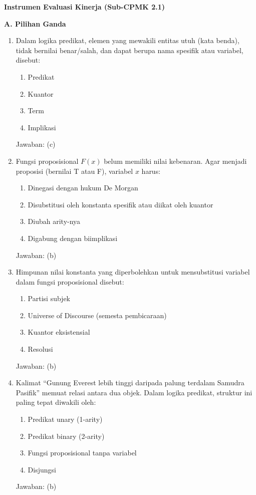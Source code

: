 \documentclass[../main]{subfiles}
\begin{document}
\begin{asesmen}
\textbf{Instrumen Evaluasi Kinerja (Sub-CPMK 2.1)}

\textbf{A. Pilihan Ganda}
\begin{enumerate}
  \item Dalam logika predikat, elemen yang mewakili entitas utuh (kata benda), tidak bernilai benar/salah, dan dapat berupa nama spesifik atau variabel, disebut:
  \begin{enumerate}
    \item Predikat
    \item Kuantor
    \item Term
    \item Implikasi
  \end{enumerate}
  Jawaban: (c)

  \item Fungsi proposisional $F(x)$ belum memiliki nilai kebenaran. Agar menjadi proposisi (bernilai T atau F), variabel $x$ harus:
  \begin{enumerate}
    \item Dinegasi dengan hukum De Morgan
    \item Disubstitusi oleh konstanta spesifik atau diikat oleh kuantor
    \item Diubah arity-nya
    \item Digabung dengan biimplikasi
  \end{enumerate}
  Jawaban: (b)

  \item Himpunan nilai konstanta yang diperbolehkan untuk mensubstitusi variabel dalam fungsi proposisional disebut:
  \begin{enumerate}
    \item Partisi subjek
    \item Universe of Discourse (semesta pembicaraan)
    \item Kuantor eksistensial
    \item Resolusi
  \end{enumerate}
  Jawaban: (b)

  \item Kalimat ``Gunung Everest lebih tinggi daripada palung terdalam Samudra Pasifik'' memuat relasi antara dua objek. Dalam logika predikat, struktur ini paling tepat diwakili oleh:
  \begin{enumerate}
    \item Predikat unary (1-arity)
    \item Predikat binary (2-arity)
    \item Fungsi proposisional tanpa variabel
    \item Disjungsi
  \end{enumerate}
  Jawaban: (b)


\end{enumerate}
\end{asesmen}
\end{document}
